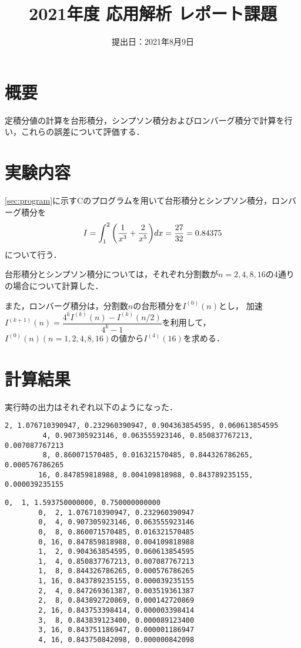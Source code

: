 \documentclass[a4paper]{bxjsarticle}
\title{2021年度 応用解析 レポート課題}
\author{\directlua{tex.print(os.getenv("AUTHOR_NAME"))}}
\date{提出日：2021年8月9日}
\begin{document}
	\maketitle


	\section{概要}
	定積分値の計算を台形積分，シンプソン積分およびロンバーグ積分で計算を行い，これらの誤差について評価する．


	\section{実験内容}
	\ref{sec:program}に示すCのプログラムを用いて台形積分とシンプソン積分，ロンバーグ積分を
	\begin{equation}
		I=\int_{1}^{2}\qty(\frac{1}{x^3}+\frac{2}{x^5})dx=\frac{27}{32}=0.84375
	\end{equation}
	について行う．

	台形積分とシンプソン積分については，それぞれ分割数が$n=2,4,8,16$の4通りの場合について計算した．

	また，ロンバーグ積分は，分割数$n$の台形積分を$I^{(0)}(n)$とし，
	加速$I^{(k+1)}(n)=\dfrac{4^k I^{(k)}(n)-I^{(k)}(n/2)}{4^k-1}$を利用して，
	$I^{(0)}(n)(n=1,2,4,8,16)$の値から$I^{(4)}(16)$を求める．


	\section{計算結果}
	実行時の出力はそれぞれ以下のようになった．

	\begin{Verbatim}[fontsize=\small, xleftmargin=10mm, gobble=2, frame=lines]
		 2, 1.076710390947, 0.232960390947, 0.904363854595, 0.060613854595
		 4, 0.907305923146, 0.063555923146, 0.850837767213, 0.007087767213
		 8, 0.860071570485, 0.016321570485, 0.844326786265, 0.000576786265
		16, 0.847859818988, 0.004109818988, 0.843789235155, 0.000039235155
	\end{Verbatim}
	\begin{Verbatim}[fontsize=\small, xleftmargin=10mm, gobble=2, frame=lines]
		0,  1, 1.593750000000, 0.750000000000
		0,  2, 1.076710390947, 0.232960390947
		0,  4, 0.907305923146, 0.063555923146
		0,  8, 0.860071570485, 0.016321570485
		0, 16, 0.847859818988, 0.004109818988
		1,  2, 0.904363854595, 0.060613854595
		1,  4, 0.850837767213, 0.007087767213
		1,  8, 0.844326786265, 0.000576786265
		1, 16, 0.843789235155, 0.000039235155
		2,  4, 0.847269361387, 0.003519361387
		2,  8, 0.843892720869, 0.000142720869
		2, 16, 0.843753398414, 0.000003398414
		3,  8, 0.843839123400, 0.000089123400
		3, 16, 0.843751186947, 0.000001186947
		4, 16, 0.843750842098, 0.000000842098
	\end{Verbatim}
\end{document}
